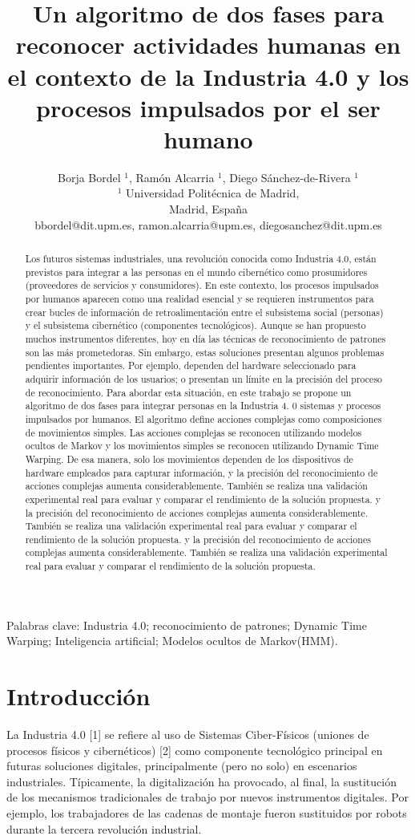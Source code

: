 \documentclass[10pt]{article}
\title {\textbf{Un algoritmo de dos fases para reconocer actividades humanas en el contexto de la Industria 4.0 y los procesos impulsados por el ser humano }}
\author{Borja Bordel $^{1}$, Ramón Alcarria ${ }^{1}$, Diego Sánchez-de-Rivera ${ }^{1}$\\
${ }^{1}$ Universidad Politécnica de Madrid,\\
Madrid, España\\
bbordel@dit.upm.es, ramon.alcarria@upm.es, diegosanchez@dit.upm.es}
\date{}
\begin{document}
\maketitle


\begin{abstract}
 Los futuros sistemas industriales, una revolución conocida como Industria 4.0, están previstos para integrar a las personas en el mundo cibernético como prosumidores (proveedores de servicios y consumidores). En este contexto, los procesos impulsados por humanos aparecen como una realidad esencial y se requieren instrumentos para crear bucles de información de retroalimentación entre el subsistema social (personas) y el subsistema cibernético (componentes tecnológicos). Aunque se han propuesto muchos instrumentos diferentes, hoy en día las técnicas de reconocimiento de patrones son las más prometedoras. Sin embargo, estas soluciones presentan algunos problemas pendientes importantes. Por ejemplo, dependen del hardware seleccionado para adquirir información de los usuarios; o presentan un límite en la precisión del proceso de reconocimiento. Para abordar esta situación, en este trabajo se propone un algoritmo de dos fases para integrar personas en la Industria 4. 0 sistemas y procesos impulsados por humanos. El algoritmo define acciones complejas como composiciones de movimientos simples. Las acciones complejas se reconocen utilizando modelos ocultos de Markov y los movimientos simples se reconocen utilizando Dynamic Time Warping. De esa manera, solo los movimientos dependen de los dispositivos de hardware empleados para capturar información, y la precisión del reconocimiento de acciones complejas aumenta considerablemente. También se realiza una validación experimental real para evaluar y comparar el rendimiento de la solución propuesta. y la precisión del reconocimiento de acciones complejas aumenta considerablemente. También se realiza una validación experimental real para evaluar y comparar el rendimiento de la solución propuesta. y la precisión del reconocimiento de acciones complejas aumenta considerablemente. También se realiza una validación experimental real para evaluar y comparar el rendimiento de la solución propuesta. 

\end{abstract}

Palabras clave: Industria 4.0; reconocimiento de patrones; Dynamic Time Warping; Inteligencia artificial; Modelos ocultos de Markov(HMM).

\section{Introducción}
La Industria 4.0 [1] se refiere al uso de Sistemas Ciber-Físicos (uniones de procesos físicos y cibernéticos) [2] como componente tecnológico principal en futuras soluciones digitales, principalmente (pero no solo) en escenarios industriales. Típicamente, la digitalización ha provocado, al final, la sustitución de los mecanismos tradicionales de trabajo por nuevos instrumentos digitales. Por ejemplo, los trabajadores de las cadenas de montaje fueron sustituidos por robots durante la tercera revolución industrial. 
\newline
\end{document}
